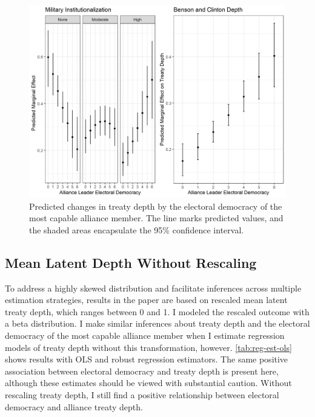 \documentclass[12pt]{article}
\begin{document}
\begin{figure}
\includegraphics[width=.95\textwidth]{results-alt-measures-sep.png}  
\caption{Predicted changes in treaty depth by the electoral democracy of the most capable alliance member. The line marks predicted values, and the shaded areas encapsulate the 95\% confidence interval.}
\label{fig:results-alt-measures-sep}
\end{figure}



\subsection{Mean Latent Depth Without Rescaling}

To address a highly skewed distribution and facilitate inferences across multiple estimation strategies, results in the paper are based on rescaled mean latent treaty depth, which ranges between 0 and 1. 
I modeled the rescaled outcome with a beta distribution. 
I make similar inferences about treaty depth and the electoral democracy of the most capable alliance member when I estimate regression models of treaty depth without this transformation, however.  
\autoref{tab:reg-est-ols} shows results with OLS and robust regression estimators. 
The same positive association between electoral democracy and treaty depth is present here, although these estimates should be viewed with substantial caution. 
Without rescaling treaty depth, I still find a positive relationship between electoral democracy and alliance treaty depth.  
\end{document}
